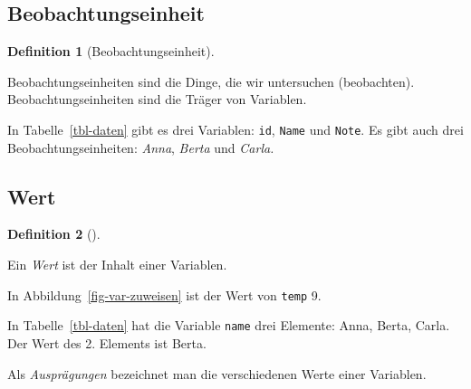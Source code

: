\documentclass[
  a4paper,
  DIV=11]{scrreprt}
\theoremstyle{definition}
\newtheorem{definition}{Definition}[chapter]
\theoremstyle{definition}
\theoremstyle{remark}
\begin{document}
\hypertarget{beobachtungseinheit}{%
\subsection{Beobachtungseinheit}\label{beobachtungseinheit}}

\leavevmode{}%
\begin{definition}[Beobachtungseinheit]\label{def-beobeinheit}

Beobachtungseinheiten sind die Dinge, die wir untersuchen (beobachten).
Beobachtungseinheiten sind die Träger von Variablen.

\end{definition}

In Tabelle~\ref{tbl-daten} gibt es drei Variablen: \texttt{id},
\texttt{Name} und \texttt{Note}. Es gibt auch drei
Beobachtungseinheiten: \emph{Anna}, \emph{Berta} und \emph{Carla.}

\hypertarget{wert}{%
\subsection{Wert}\label{wert}}

\leavevmode{}%
\begin{definition}[]\label{def-wert}

Ein \emph{Wert} ist der Inhalt einer Variablen.

\end{definition}

In Abbildung~\ref{fig-var-zuweisen} ist der Wert von \texttt{temp} 9.

In Tabelle~\ref{tbl-daten} hat die Variable \texttt{name} drei Elemente:
Anna, Berta, Carla. Der Wert des 2. Elements ist Berta.

Als \emph{Ausprägungen} bezeichnet man die verschiedenen Werte einer
Variablen.
\end{document}
